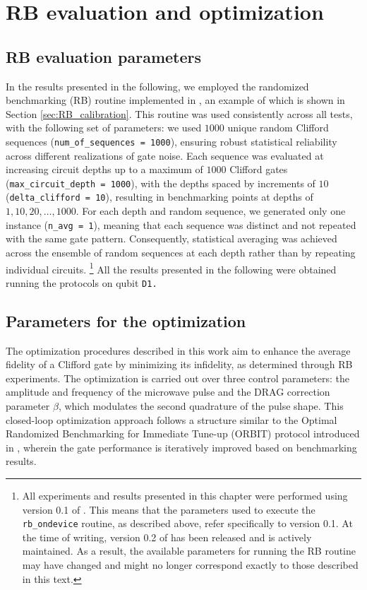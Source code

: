 \section{RB evaluation and optimization}

\subsection{RB evaluation parameters}\label{sec:RB_parameters}
In the results presented in the following, we employed the randomized benchmarking (RB) routine implemented in \Qibocal, an example of which is shown in Section \ref{sec:RB_calibration}. 
This routine was used consistently across all tests, with the following set of parameters: we used $1000$ unique random Clifford sequences (\texttt{num\_of\_sequences = 1000}), ensuring robust statistical reliability across different realizations of gate noise. 
Each sequence was evaluated at increasing circuit depths up to a maximum of $1000$ Clifford gates (\texttt{max\_circuit\_depth = 1000}), with the depths spaced by increments of $10$ (\texttt{delta\_clifford = 10}), resulting in benchmarking points at depths of $1, 10, 20, \ldots, 1000$. 
For each depth and random sequence, we generated only one instance (\texttt{n\_avg = 1}), meaning that each sequence was distinct and not repeated with the same gate pattern. 
Consequently, statistical averaging was achieved across the ensemble of random sequences at each depth rather than by repeating individual circuits. 
\footnote{All experiments and results presented in this chapter were performed using version 0.1 of \Qibocal. This means that the parameters used to execute the \texttt{rb\_ondevice} routine, as described above, refer specifically to version 0.1. At the time of writing, version 0.2 of \Qibocal has been released and is actively maintained. As a result, the available parameters for running the RB routine may have changed and might no longer correspond exactly to those described in this text.}
All the results presented in the following were obtained running the protocols on qubit \tt{D1}.

\subsection{Parameters for the optimization}
The optimization procedures described in this work aim to enhance the average fidelity of a Clifford gate by minimizing its infidelity, as determined through RB experiments. 
The optimization is carried out over three control parameters: the amplitude and frequency of the microwave pulse and the DRAG correction parameter $\beta$, which modulates the second quadrature of the pulse shape. 
This closed-loop optimization approach follows a structure similar to the Optimal Randomized Benchmarking for Immediate Tune-up (ORBIT) protocol introduced in \cite{kelly_optimal_2014}, wherein the gate performance is iteratively improved based on benchmarking results.


